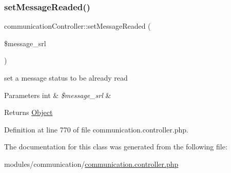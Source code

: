 \subsubsection{\texorpdfstring{set\+Message\+Readed()}{setMessageReaded()}}
{\footnotesize\ttfamily communication\+Controller\+::set\+Message\+Readed (\begin{DoxyParamCaption}\item[{}]{\$message\+\_\+srl }\end{DoxyParamCaption})}

set a message status to be \textquotesingle{}already read\textquotesingle{} 
\begin{DoxyParams}[1]{Parameters}
int & {\em \$message\+\_\+srl} & \\
\hline
\end{DoxyParams}
\begin{DoxyReturn}{Returns}
\hyperlink{classObject}{Object} 
\end{DoxyReturn}


Definition at line 770 of file communication.\+controller.\+php.



The documentation for this class was generated from the following file\+:\begin{DoxyCompactItemize}
\item 
modules/communication/\hyperlink{communication_8controller_8php}{communication.\+controller.\+php}\end{DoxyCompactItemize}
